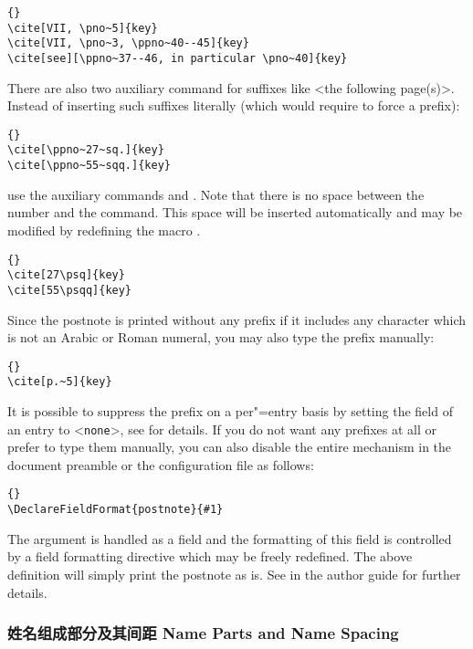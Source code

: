 \begin{lstlisting}[style=latex]{}
\cite[VII, \pno~5]{key}
\cite[VII, \pno~3, \ppno~40--45]{key}
\cite[see][\ppno~37--46, in particular \pno~40]{key}
\end{lstlisting}
%
There are also two auxiliary command for suffixes like <the following page(s)>. Instead of inserting such suffixes literally (which would require  to force a prefix):

\begin{lstlisting}[style=latex]{}
\cite[\ppno~27~sq.]{key}
\cite[\ppno~55~sqq.]{key}
\end{lstlisting}
%
use the auxiliary commands  and . Note that there is no space between the number and the command. This space will be inserted automatically and may be modified by redefining the macro .

\begin{lstlisting}[style=latex]{}
\cite[27\psq]{key}
\cite[55\psqq]{key}
\end{lstlisting}
%
Since the postnote is printed without any prefix if it includes any character which is not an Arabic or Roman numeral, you may also type the prefix manually:

\begin{lstlisting}[style=latex]{}
\cite[p.~5]{key}
\end{lstlisting}
%
It is possible to suppress the prefix on a per"=entry basis by setting the  field of an entry to <\texttt{none}>, see  for details. If you do not want any prefixes at all or prefer to type them manually, you can also disable the entire mechanism in the document preamble or the configuration file as follows:

\begin{lstlisting}[style=latex]{}
\DeclareFieldFormat{postnote}{#1}
\end{lstlisting}
%
The  argument is handled as a field and the formatting of this field is controlled by a field formatting directive which may be freely redefined. The above definition will simply print the postnote as is. See  in the author guide for further details.

\subsubsection{姓名组成部分及其间距 Name Parts and Name Spacing}
\label{use:cav:nam}

